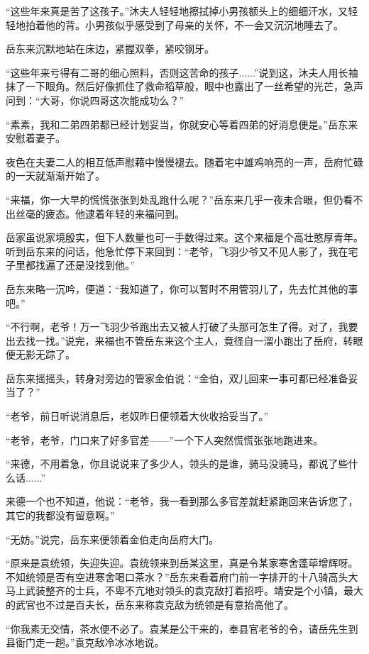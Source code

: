 “这些年来真是苦了这孩子。”沐夫人轻轻地擦拭掉小男孩额头上的细细汗水，又轻轻地拍着他的背。小男孩似乎感受到了母亲的关怀，不一会又沉沉地睡去了。

岳东来沉默地站在床边，紧握双拳，紧咬钢牙。

“这些年来亏得有二哥的细心照料，否则这苦命的孩子......”说到这，沐夫人用长袖抹了一下眼角。然后好像抓住了救命稻草般，眼中也露出了一丝希望的光芒，急声问到：“大哥，你说四哥这次能成功么？”

“素素，我和二弟四弟都已经计划妥当，你就安心等着四弟的好消息便是。”岳东来安慰着妻子。

夜色在夫妻二人的相互低声慰藉中慢慢褪去。随着宅中雄鸡响亮的一声，岳府忙碌的一天就渐渐开始了。

\splitline

“来福，你一大早的慌慌张张到处乱跑什么呢？”岳东来几乎一夜未合眼，但仍看不出丝毫的疲态。他逮着年轻的来福问到。

岳家虽说家境殷实，但下人数量也可一手数得过来。这个来福是个高壮憨厚青年。听到岳东来的问话，他急忙停下来回到：“老爷，飞羽少爷又不见人影了，我在宅子里都找遍了还是没找到他。”

岳东来略一沉吟，便道：“我知道了，你可以暂时不用管羽儿了，先去忙其他的事吧。”

“不行啊，老爷！万一飞羽少爷跑出去又被人打破了头那可怎生了得。对了，我要出去找一找。”说完，来福也不管岳东来这个主人，竟径自一溜小跑出了岳府，转眼便无影无踪了。

岳东来摇摇头，转身对旁边的管家金伯说：“金伯，双儿回来一事可都已经准备妥当了？”

“老爷，前日听说消息后，老奴昨日便领着大伙收拾妥当了。”

“老爷，老爷，门口来了好多官差------”一个下人突然慌慌张张地跑进来。

“来德，不用着急，你且说说来了多少人，领头的是谁，骑马没骑马，都说了些什么话......”

来德一个也不知道，他说：“老爷，我一看到那么多官差就赶紧跑回来告诉您了，其它的我都没有留意啊。”

“无妨。”说完，岳东来便领着金伯走向岳府大门。

\splitline

“原来是袁统领，失迎失迎。袁统领来到岳某这里，真是令某家寒舍蓬荜增辉呀。不知统领是否有空进寒舍喝口茶水？”岳东来看着府门前一字排开的十八骑高头大马上武装整齐的士兵，不卑不亢地对领头的袁克敌打着招呼。靖安是个小镇，最大的武官也不过是百夫长，岳东来称袁克敌为统领是有意抬高他了。

“你我素无交情，茶水便不必了。袁某是公干来的，奉县官老爷的令，请岳先生到县衙门走一趟。”袁克敌冷冰冰地说。

